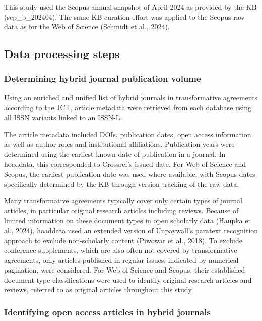 \documentclass[a4paper,man,floatsintext,longtable,noextraspace,10pt]{apa6}
\begin{document}
This study used the Scopus annual snapshot of April 2024 as provided by
the KB (scp\_b\_202404). The same KB curation effort was applied to the
Scopus raw data as for the Web of Science (Schmidt et al., 2024).

\subsection{Data processing steps}\label{data-processing-steps}

\subsubsection{Determining hybrid journal publication
volume}\label{determining-hybrid-journal-publication-volume}

Using an enriched and unified list of hybrid journals in transformative
agreements according to the JCT, article metadata were retrieved from
each database using all ISSN variants linked to an ISSN-L.

The article metadata included DOIs, publication dates, open access
information as well as author roles and institutional affiliations.
Publication years were determined using the earliest known date of
publication in a journal. In hoaddata, this corresponded to Crossref's
issued date. For Web of Science and Scopus, the earliest publication
date was used where available, with Scopus dates specifically determined
by the KB through version tracking of the raw data.

Many transformative agreements typically cover only certain types of
journal articles, in particular original research articles including
reviews. Because of limited information on these document types in open
scholarly data (Haupka et al., 2024), hoaddata used an extended version
of Unpaywall's paratext recognition approach to exclude non-scholarly
content (Piwowar et al., 2018). To exclude conference supplements, which
are also often not covered by transformative agreements, only articles
published in regular issues, indicated by numerical pagination, were
considered. For Web of Science and Scopus, their established document
type classifications were used to identify original research articles
and reviews, referred to as original articles throughout this study.

\subsubsection{Identifying open access articles in hybrid
journals}\label{identifying-open-access-articles-in-hybrid-journals}
\end{document}
